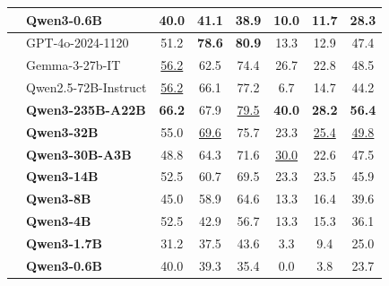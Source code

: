 \begin{table}[tbp]
{\begin{tabular}{clcccccc}
 & \textbf{Qwen3-0.6B} & 40.0 & 41.1 & 38.9 & 10.0 & 11.7 & 28.3 \\
\midrule
{} & GPT-4o-2024-1120 & 51.2 & \textbf{78.6} & \textbf{80.9} & 13.3 & 12.9 & 47.4 \\
 & Gemma-3-27b-IT & \underline{56.2} & 62.5 & 74.4 & 26.7 & 22.8 & 48.5 \\
 & Qwen2.5-72B-Instruct & \underline{56.2} & 66.1 & 77.2 & 6.7 & 14.7 & 44.2 \\
 & \textbf{Qwen3-235B-A22B} & \textbf{66.2} & 67.9 & \underline{79.5} & \textbf{40.0} & \textbf{28.2} & \textbf{56.4} \\
 & \textbf{Qwen3-32B} & 55.0 & \underline{69.6} & 75.7 & 23.3 & \underline{25.4} & \underline{49.8} \\
 & \textbf{Qwen3-30B-A3B} & 48.8 & 64.3 & 71.6 & \underline{30.0} & 22.6 & 47.5 \\
 & \textbf{Qwen3-14B} & 52.5 & 60.7 & 69.5 & 23.3 & 23.5 & 45.9 \\
 & \textbf{Qwen3-8B} & 45.0 & 58.9 & 64.6 & 13.3 & 16.4 & 39.6 \\
 & \textbf{Qwen3-4B} & 52.5 & 42.9 & 56.7 & 13.3 & 15.3 & 36.1 \\
 & \textbf{Qwen3-1.7B} & 31.2 & 37.5 & 43.6 & 3.3 & 9.4 & 25.0 \\
 & \textbf{Qwen3-0.6B} & 40.0 & 39.3 & 35.4 & 0.0 & 3.8 & 23.7 \\
\bottomrule
\end{tabular}
}
\end{table}

